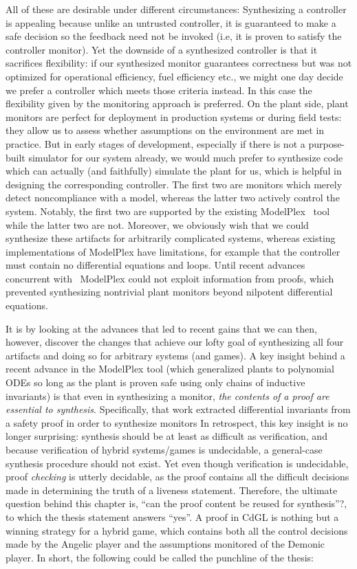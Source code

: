 \documentclass[12pt]{cmuthesis}
\theoremstyle{definition}
\theoremstyle{remark}
\newcommand{\CdGL}{\textsf{CdGL}\xspace}
\newcommand{\ModelPlex}{ModelPlex\xspace}
\begin{document}
All of these are desirable under different circumstances:
Synthesizing a controller is appealing because unlike an untrusted controller, it is guaranteed to make a safe decision so the feedback need not be invoked (i.e, it is proven to satisfy the controller monitor).
Yet the downside of a synthesized controller is that it sacrifices flexibility: if our synthesized monitor guarantees correctness but was not optimized for operational efficiency, fuel efficiency etc., we might one day decide we prefer a controller which meets those criteria instead.
In this case the flexibility given by the monitoring approach is preferred.
On the plant side, plant monitors are perfect for deployment in production systems or during field tests: they allow us to assess whether assumptions on the environment are met in practice.
But in early stages of development, especially if there is not a purpose-built simulator for our system already, we would much prefer to synthesize code which can actually (and faithfully) simulate the plant for us, which is helpful in designing the corresponding controller.
The first two are monitors which merely detect noncompliance with a model, whereas the latter two actively control the system.
Notably, the first two are supported by the existing \ModelPlex~\cite{DBLP:journals/fmsd/MitschP16} tool while the latter two are not.
Moreover, we obviously wish that we could synthesize these artifacts for arbitrarily complicated systems, whereas existing implementations of \ModelPlex have limitations, for example that the controller must contain no differential equations and loops.
Until recent advances concurrent with~\cite{DBLP:conf/pldi/BohrerTMMP18} ModelPlex could not exploit information from proofs, which prevented synthesizing nontrivial plant monitors beyond nilpotent differential equations.

It is by looking at the advances that led to recent gains that we can then, however, discover the changes that achieve our lofty goal of synthesizing all four artifacts and doing so for arbitrary systems (and games).
A key insight behind a recent advance in the \ModelPlex tool (which generalized plants to polynomial ODEs so long as the plant is proven safe using only chains of inductive invariants) is that even in synthesizing a monitor, \emph{the contents of a proof are essential to synthesis}.
Specifically, that work extracted differential invariants from a safety proof in order to synthesize monitors
In retrospect, this key insight is no longer surprising: synthesis should be at least as difficult as verification, and because verification of hybrid systems/games is undecidable, a general-case synthesis procedure should not exist.
Yet even though verification is undecidable, proof \emph{checking} is utterly decidable, as the proof contains all the difficult decisions made in determining the truth of a liveness statement.
Therefore, the ultimate question behind this chapter is, ``can the proof content be reused for synthesis''?, to which the thesis statement answers ``yes''.
A proof in \CdGL is nothing but a winning strategy for a hybrid game, which contains both all the control decisions made by the Angelic player and the assumptions monitored of the Demonic player.
In short, the following could be called the punchline of the thesis:
\end{document}
